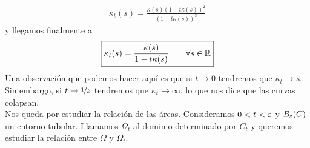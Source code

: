 \begin{ejercicio}
\begin{solucion}
        \begin{gather*}
            \kappa_t(s) = \frac{\kappa(s)(1-t\kappa(s))^2}{(1-t\kappa(s))^3}
        \end{gather*}
        y llegamos finalmente a 
        \begin{gather*}
            \boxed{\kappa_t(s) = \frac{\kappa(s)}{1-t\kappa(s)} \qquad \forall s \in \mathbb{R}}
        \end{gather*}
        Una observación que podemos hacer aquí es que si $t\to 0$ tendremos que $\kappa_t \to \kappa$. Sin embargo, si $t\to \nicefrac{1}{k}$ tendremos que $\kappa_t\to \infty$, lo que nos dice que las curvas colapsan.\\

        Nos queda por estudiar la relación de las áreas. Consideramos $0<t<\varepsilon$ y $B_\varepsilon(C)$ un entorno tubular. Llamamos $\Omega_t$ al dominio determinado por $C_t$ y queremos estudiar la relación entre $\Omega$ y $\Omega_t$.\\


\end{solucion}
\end{ejercicio}
